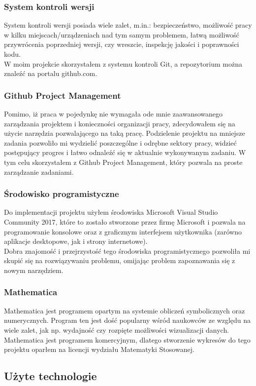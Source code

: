 \documentclass[twoside]{projektInzynierskiMS1}
\newcommand{\si}{ś}
\begin{document}
	\subsubsection{System kontroli wersji}
	System kontroli wersji posiada wiele zalet, m.in.: bezpieczeństwo, możliwo\si ć pracy w kilku miejscach/urządzeniach nad tym samym problemem, łatwą możliwo\si ć przywrócenia poprzedniej wersji, czy wreszcie, inspekcję jako\si ci i poprawno\si ci kodu. \\
W moim projekcie skorzystałem z systemu kontroli Git, a repozytorium można znaleźć na portalu github.com. 
	\subsubsection{Github Project Management}
Pomimo, iż praca w pojedynkę nie wymagała ode mnie zaawansowanego zarządzania projektem i konieczno\si ci organizacji pracy, zdecydowałem się na użycie narzędzia pozwalającego na taką pracę. Podzielenie projektu na mniejsze zadania pozwoliło mi wydzielić poszczególne i odrębne sektory pracy, widzieć postępujący progres i łatwo odnaleźć się w aktualnie wykonywanym zadaniu. W tym celu skorzystałem z Github Project Management, który pozwala na proste zarządzanie zadaniami.
	\subsubsection{Środowisko programistyczne}
Do implementacji projektu użyłem \si rodowiska Microsoft Visual Studio Community 2017, które to zostało stworzone przez firmę Microsoft i pozwala na programowanie konsolowe oraz z graficznym interfejsem użytkownika (zarówno aplikacje desktopowe, jak i strony internetowe).  \\
Dobra znajomo\si ć i przejrzysto\si ć tego \si rodowiska programistycznego pozwoliła mi skupić się na rozwiązywaniu problemu, omijając problem zapoznawania się z nowym narzędziem.
	\subsubsection{Mathematica}
	Mathematica jest programem opartym na systemie obliczeń symbolicznych oraz numerycznych. Program ten jest do\si ć popularny w\si ród naukowców ze względu na wiele zalet, jak np. wydajno\si ć czy rozpięte możliwo\si ci wizualizacji danych. Mathematica jest programem komercyjnym, dlatego stworzenie wykresów do tego projektu oparłem na licencji wydziału Matematyki Stosowanej.
	
	\subsection{Użyte technologie}
\end{document}

